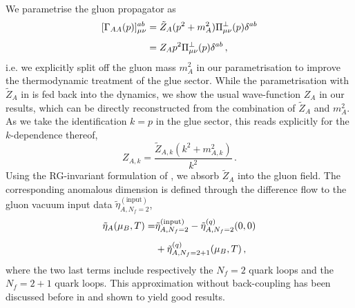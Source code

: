 \documentclass[10pt,prd,superscriptaddress,twocolumn]{revtex4-2}
\begin{document}
We parametrise the gluon propagator as
%
\begin{align}\label{eq:QCDPD_glueParam}
	[\Gamma_{AA}(p)]^{ab}_{\mu\nu} &= \tilde{Z}_A (p^2 + m_A^2)\Pi^\perp_{\mu\nu}(p)\delta^{ab} 
	\notag\\[1ex]
	&= Z_A p^2 \Pi^\perp_{\mu\nu}(p)\delta^{ab}
	\,,
\end{align}
%
i.e. we explicitly split off the gluon mass $m^2_A$ in our parametrisation to improve the thermodynamic treatment of the glue sector. While the parametrisation with $\tilde{Z}_A$ in  is fed back into the dynamics, we show the usual wave-function $Z_A$ in our results, which can be directly reconstructed from the combination of $\tilde{Z}_A$ and $m^2_A$. As we take the identification $k = p$ in the glue sector, this reads explicitly for the $k$-dependence thereof,
%
\begin{equation}
	Z_{A,k} = \frac{\tilde{Z}_{A,k} (k^2 + m_{A,k}^2)}{k^2}
	\,.
\end{equation}
%
Using the {RG}-invariant formulation of \cite{Ihssen:2024miv}, we absorb $\tilde{Z}_A$ into the gluon field. The corresponding anomalous dimension is defined through the difference flow to the gluon vacuum input data $\tilde{\eta}_{A,N_f=2}^{(\textrm{input})}$,
%
\begin{align}
	\tilde{\eta}_A(\mu_B,T) = &\tilde{\eta}_{A,N_f=2}^{(\textrm{input})} - \tilde{\eta}_{A,N_f=2}^{(q)}(0,0) 
    \notag\\[1ex]
    &+ \tilde{\eta}_{A,N_f=2+1}^{(q)}(\mu_B,T)
	\,,
\end{align}
%
where the two last terms include respectively the $N_f=2$ quark loops and the $N_f=2+1$ quark loops. This approximation without back-coupling has been discussed before in \cite{Fu:2019hdw} and shown to yield good results.
\end{document}

